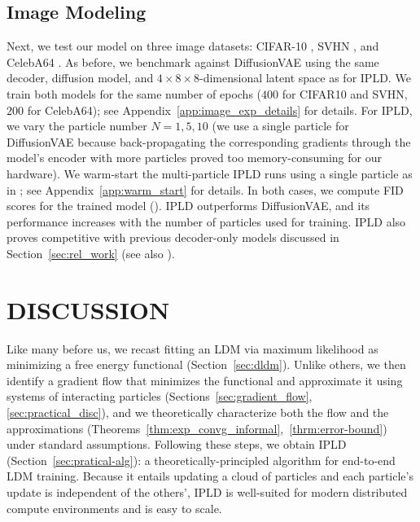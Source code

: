 \documentclass[twoside]{article}
\begin{document}
\subsection{Image Modeling}\label{sec:image} Next,  we test our model on three image datasets: CIFAR-10 \citep{krizhevsky2009learning}, SVHN \citep{svhn2011}, and CelebA64 \citep{liu2015faceattributes}. As before, we benchmark against \gls*{DiffusionVAE} using the same decoder, diffusion model, and $4\times 8\times 8$-dimensional latent space as for \gls*{IPLD}. We train both models for the same number of epochs ($400$ for CIFAR10 and SVHN, $200$ for CelebA64); see Appendix~\ref{app:image_exp_details} for details. For \gls*{IPLD}, we vary the particle number $N=1,5,10$ (we use a single particle for \gls*{DiffusionVAE} because back-propagating the corresponding gradients through the model's encoder with more particles proved too memory-consuming for our hardware). We warm-start the multi-particle \gls*{IPLD} runs using a single particle as in \citet{kuntz23a}; see Appendix~\ref{app:warm_start} for details. In both cases, we compute \gls*{FID} scores for the trained model (). \gls*{IPLD} outperforms \gls*{DiffusionVAE}, and its performance increases with the number of particles used for training. 
\gls*{IPLD} also proves competitive with previous decoder-only models discussed in Section~\ref{sec:rel_work} (see also ).


\section{DISCUSSION}\label{sec:conclusion}
Like many before us, we recast fitting an \gls*{LDM} via maximum likelihood as minimizing a free energy functional (Section~\ref{sec:dldm}). Unlike others, we then identify a gradient flow that minimizes the functional and approximate it using systems of interacting particles (Sections~\ref{sec:gradient_flow}, \ref{sec:practical_disc}), and we theoretically characterize both the flow and the approximations (Theorems~\ref{thm:exp_convg_informal},~\ref{thrm:error-bound}) under standard assumptions. Following these steps, we obtain \gls*{IPLD} (Section~\ref{sec:pratical-alg}): a theoretically-principled algorithm for end-to-end \gls*{LDM} training. Because it entails updating a cloud of particles and each particle's update is independent of the others',  \gls*{IPLD} is well-suited for modern distributed compute environments and is easy to scale. 
\end{document}
